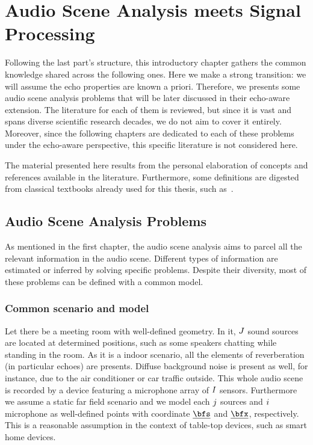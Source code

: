 \chapter{Audio Scene Analysis meets Signal Processing}\label{ch:application}

 \synopsisChApplication

\mynewline
Following the last part's structure, this introductory chapter gathers the common knowledge shared across the following ones.
Here we make a strong transition: we will assume the echo properties are known a priori.
Therefore, we presents some audio scene analysis problems that will be later discussed in their echo-aware extension.
The literature for each of them is reviewed, but since it is vast and spans diverse scientific research decades, we do not aim to cover it entirely.
Moreover, since the following chapters are dedicated to each of these problems under the echo-aware perspective, this specific literature is not considered here.

\mynewline
The material presented here results from the personal elaboration of concepts and references available in the literature.
Furthermore, some definitions are digested from classical textbooks already used for this thesis, such as~.

\section{Audio Scene Analysis Problems}\label{sec:application:scenario}
As mentioned in the first chapter, the audio scene analysis aims to parcel all the relevant information in the audio scene.
Different types of information are estimated or inferred by solving specific problems.
Despite their diversity, most of these problems can be defined with a common model.

\subsection{Common scenario and model}
Let there be a meeting room with well-defined geometry.
In it, $J$ sound sources are located at determined positions, such as some speakers chatting while standing in the room.
As it is a indoor scenario, all the elements of reverberation (in particular echoes) are presents.
Diffuse background noise is present as well, for instance, due to the air conditioner or car traffic outside.
This whole audio scene is recorded by a device featuring a microphone array of $I$ sensors.
Furthermore we assume a static far field scenario and we model each $j$ sources and $i$ microphone as well-defined points with coordinate $\positionSource$ and $\positionMicrophone$, respectively.
This is a reasonable assumption in the context of table-top devices, such as smart home devices.


